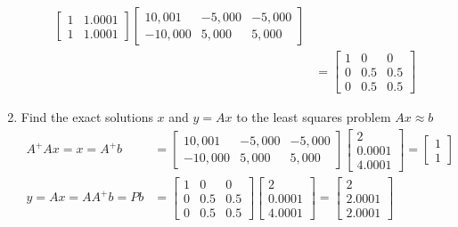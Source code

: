 \documentclass[12pt]{article}
\begin{document}
\begin{enumerate}[label = (\alph*)]
\begin{align*}
\begin{bmatrix}
				1 & 1.0001 \\
				1 & 1.0001
			\end{bmatrix}
			\begin{bmatrix}
				10,001 & -5,000 & -5,000 \\
				-10,000 & 5,000 & 5,000
			\end{bmatrix} \\
			&=
			\begin{bmatrix}
				1 & 0 & 0 \\
				0 & 0.5 & 0.5  \\
				0 & 0.5 & 0.5
			\end{bmatrix}
			\end{align*}
		\item Find the exact solutions $x$ and $y = Ax$ to the least squares problem $Ax \approx b$
			\begin{align*}
				A^{+}Ax = x = A^+b &= 
				\begin{bmatrix}
					10,001 & -5,000 & -5,000 \\
					-10,000 & 5,000 & 5,000
				\end{bmatrix}
				\begin{bmatrix}
					2 \\
					0.0001 \\
					4.0001
				\end{bmatrix}
				=
				\begin{bmatrix}
					1 \\ 1
				\end{bmatrix} \\
				y = Ax = AA^+b = Pb &=
				\begin{bmatrix}
				 	1 & 0 & 0 \\
					0 & 0.5 & 0.5  \\
					0 & 0.5 & 0.5
				\end{bmatrix}
				\begin{bmatrix}
					2 \\
					0.0001 \\
					4.0001
				\end{bmatrix}
				= 
				\begin{bmatrix}
					2 \\ 2.0001 \\ 2.0001
				\end{bmatrix}
			\end{align*}
		
		\newpage 
		

\end{enumerate}
\end{document}
